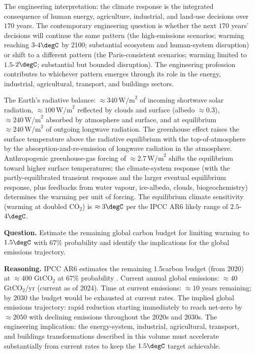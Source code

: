 The engineering interpretation: the climate response is the integrated consequence of human energy, agriculture, industrial, and land-use decisions over $170$ years. The contemporary engineering question is whether the next $170$ years' decisions will continue the same pattern (the high-emissions scenarios; warming reaching $3$-$4\degC$ by 2100; substantial ecosystem and human-system disruption) or shift to a different pattern (the Paris-consistent scenarios; warming limited to $1.5$-$2\degC$; substantial but bounded disruption). The engineering profession contributes to whichever pattern emerges through its role in the energy, industrial, agricultural, transport, and buildings sectors.

\begin{archetype}
The Earth's radiative balance: $\approx 340\,\text{W/m}^2$ of incoming shortwave solar radiation, $\approx 100\,\text{W/m}^2$ reflected by clouds and surface (albedo $\approx 0.3$), $\approx 240\,\text{W/m}^2$ absorbed by atmosphere and surface, and at equilibrium $\approx 240\,\text{W/m}^2$ of outgoing longwave radiation. The greenhouse effect raises the surface temperature above the radiative equilibrium with the top-of-atmosphere by the absorption-and-re-emission of longwave radiation in the atmosphere. Anthropogenic greenhouse-gas forcing of $\approx 2.7\,\text{W/m}^2$ shifts the equilibrium toward higher surface temperatures; the climate-system response (with the partly-equilibrated transient response and the larger eventual equilibrium response, plus feedbacks from water vapour, ice-albedo, clouds, biogeochemistry) determines the warming per unit of forcing. The equilibrium climate sensitivity (warming at doubled CO$_2$) is $\approx 3\degC$ per the IPCC AR6 likely range of $2.5$-$4\degC$.
\end{archetype}

\begin{estimation}
\textbf{Question.} Estimate the remaining global carbon budget for limiting warming to $1.5\degC$ with $67\%$ probability and identify the implications for the global emissions trajectory.

\textbf{Reasoning.} IPCC AR6 estimates the remaining 1.5\degC carbon budget (from 2020) at $\approx 400$ GtCO$_2$ at $67\%$ probability \cite{std:ipcc-ar6-wg1-2021}. Current annual global emissions: $\approx 40$ GtCO$_2$/yr (current as of 2024). Time at current emissions: $\approx 10$ years remaining; by 2030 the budget would be exhausted at current rates. The implied global emissions trajectory: rapid reduction starting immediately to reach net-zero by $\approx 2050$ with declining emissions throughout the 2020s and 2030s. The engineering implication: the energy-system, industrial, agricultural, transport, and buildings transformations described in this volume must accelerate substantially from current rates to keep the $1.5\degC$ target achievable.
\end{estimation}

